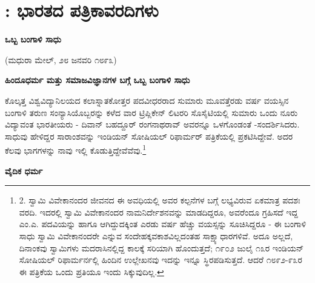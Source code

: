 
\chapter{: ಭಾರತದ ಪತ್ರಿಕಾವರದಿಗಳು}

\begin{center}
\textbf{ಒಬ್ಬ ಬಂಗಾಳಿ ಸಾಧು}
\end{center}

\begin{center}
(ಮಧುರಾ ಮೇಲ್, ೨೮ ಜನವರಿ ೧೮೯೩)
\end{center}

\begin{center}
\textbf{ಹಿಂದೂಧರ್ಮ ಮತ್ತು ಸಮಾಜವಿಜ್ಞಾನಗಳ ಬಗ್ಗೆ ಒಬ್ಬ ಬಂಗಾಳಿ ಸಾಧು}
\end{center}

ಕೊಲ್ಕತ್ತ ವಿಶ್ವವಿದ್ಯಾನಿಲಯದ ಕಲಾಸ್ನಾತಕೋತ್ತರ ಪದವೀಧರರಾದ ಸುಮಾರು ಮೂವತ್ತೆರಡು ವರ್ಷ ವಯಸ್ಸಿನ ಬಂಗಾಳಿ ತರುಣ ಸಂನ್ಯಾಸಿಯೊಬ್ಬರನ್ನು ಕಳೆದ ವಾರ ಟ್ರಿಪ್ಲಿಕೇನ್ ಲಿಟರರಿ ಸೊಸೈಟಿಯಲ್ಲಿ ಸುಮಾರು ಒಂದು ನೂರು ವಿದ್ಯಾವಂತ ಭಾರತೀಯರು - ದಿವಾನ್ ಬಹದ್ದೂರ್ ರಂಗನಾಥರಾವ್ ಅವರನ್ನೂ ಒಳಗೊಂಡಂತೆ -ಸಂದರ್ಶಿಸಿದರು. ಸಾಧುವು ಹೇಳಿದ್ದರ ಸಾರಾಂಶವನ್ನು ಇಂಡಿಯನ್ ಸೋಷಿಯಲ್ ರಿಫಾರ್ಮರ್ ಪತ್ರಿಕೆಯಲ್ಲಿ ಪ್ರಕಟಿಸಿದ್ದೇವೆ. ಅದರ ಕೆಲವು ಭಾಗಗಳನ್ನು ನಾವು ಇಲ್ಲಿ ಕೊಡುತ್ತಿದ್ದೇವೆವೆವು.\footnote{2. ಸ್ವಾಮಿ ವಿವೇಕಾನಂದರ ಜೀವನದ ಈ ಅವಧಿಯಲ್ಲಿ ಅವರ ಕಲ್ಪನೆಗಳ ಬಗ್ಗೆ ಲಭ್ಯವಿರುವ ಏಕಮಾತ್ರ ಪದಶಃ ವರದಿ. ಇದರಲ್ಲಿ ಸ್ವಾಮಿ ವಿವೇಕಾನಂದರ ನಾಮನಿರ್ದೇಶನವನ್ನು ಮಾಡದಿದ್ದರೂ, ಅವರೆಂದೂ ಗ್ರಹಿಸದೆ ಇದ್ದ ಎಂ.ಎ. ಪದವಿಯನ್ನು ಹಾಗೂ ಆಗಿದ್ದುದಕ್ಕಿಂತ ಎರಡು ವರ್ಷ ಹೆಚ್ಚು ವಯಸ್ಸನ್ನು ಸೂಚಿಸಿದ್ದರೂ - ಈ ಬಂಗಾಳಿ ಸಾಧು ಸ್ವಾಮಿ ವಿವೇಕಾನಂದರೇ ಎನ್ನುವ ಸಂದೇಹಕ್ಕವಕಾಶವಿಲ್ಲದಂತಹ ಸಾಕ್ಷ್ಯಾಧಾರಗಳಿವೆ. ಅದೂ ಅಲ್ಲದೆ, ದಿನಾಂಕವು ಸ್ವಾಮಿಗಳು ಮದರಾಸಿನಲ್ಲಿದ್ದ ಕಾಲಕ್ಕೆ ಸರಿಯಾಗಿ ಹೊಂದುತ್ತದೆ; ೧೯೦೨ ಜುಲೈ ೧೩ರ ಇಂಡಿಯನ್ ಸೋಷಿಯಲ್ ರಿಫಾರ್ಮರ್ನಲ್ಲಿ ಹಿಂದಿನ ಉಲ್ಲೇಖನವು ಇದನ್ನು ಇನ್ನೂ ಸ್ಥಿರಪಡಿಸುತ್ತದೆ. ಆದರೆ ೧೮೯೨-೯೩ರ ಈ ಪತ್ರಿಕೆಯ ಒಂದು ಪ್ರತಿಯೂ ಇಂದು ಸಿಕ್ಕುವುದಿಲ್ಲ.}

\begin{center}
\textbf{ವೈದಿಕ ಧರ್ಮ}
\end{center}

